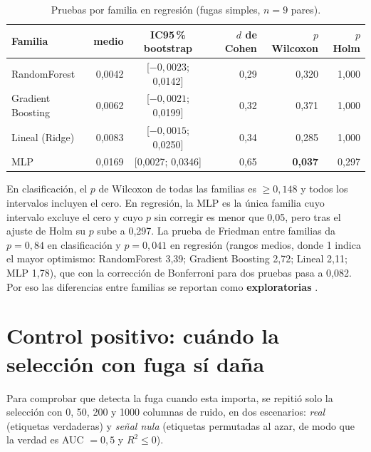 \begin{table}[!htbp]
\centering
\caption{Pruebas por familia en regresión (fugas simples, $n=9$ pares).}
\label{tab:tests}
\begingroup\footnotesize\singlespacing
\begin{tabular}{@{}l r c r r r@{}}
\toprule
Familia & \DOpt{} medio & IC95\,\% bootstrap & $d$ de Cohen & $p$ Wilcoxon & $p$ Holm \\
\midrule
RandomForest & 0,0042 & [$-0{,}0023$; 0,0142] & 0,29 & 0,320 & 1,000 \\
Gradient Boosting & 0,0062 & [$-0{,}0021$; 0,0199] & 0,32 & 0,371 & 1,000 \\
Lineal (Ridge) & 0,0083 & [$-0{,}0015$; 0,0250] & 0,34 & 0,285 & 1,000 \\
MLP & 0,0169 & [0,0027; 0,0346] & 0,65 & \textbf{0,037} & 0,297 \\
\bottomrule
\end{tabular}
\endgroup
\end{table}

En clasificación, el $p$ de Wilcoxon de todas las familias es $\geq 0{,}148$ y todos los intervalos incluyen el cero. En regresión, la MLP es la única familia cuyo intervalo excluye el cero y cuyo $p$ sin corregir es menor que 0,05, pero tras el ajuste de Holm \parencite{holm1979} su $p$ sube a 0,297. La prueba de Friedman entre familias da $p=0{,}84$ en clasificación y $p=0{,}041$ en regresión (rangos medios, donde 1 indica el mayor optimismo: RandomForest 3,39; Gradient Boosting 2,72; Lineal 2,11; MLP 1,78), que con la corrección de Bonferroni para dos pruebas pasa a 0,082. Por eso las diferencias entre familias se reportan como \textbf{exploratorias} \parencite{demsar2006}.

\section{Control positivo: cuándo la selección con fuga sí daña}
\label{sec:control}

Para comprobar que \DOpt{} detecta la fuga cuando esta importa, se repitió solo la selección con 0, 50, 200 y 1000 columnas de ruido, en dos escenarios: \emph{real} (etiquetas verdaderas) y \emph{señal nula} (etiquetas permutadas al azar, de modo que la verdad es AUC $=0{,}5$ y $R^2\leq 0$).

